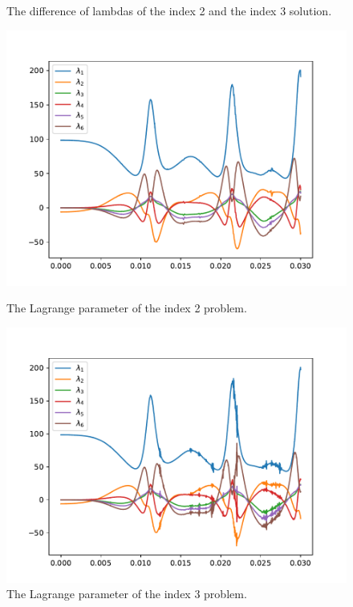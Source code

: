 \documentclass{report}
\begin{document}
\begin{figure}[h]
\begin{minipage}[t]{0.45\textwidth}
\caption{The difference of lambdas of the index 2 and the index 3 solution.}
\label{pl:indx2_solndiff_lambdas}
\end{minipage}
\end{figure}

\begin{figure}[h]
\centering
\begin{minipage}[t]{0.45\textwidth}
\centering
\includegraphics[width=\textwidth]{../Plots/Project2_main/Figure_515}
\caption{The Lagrange parameter of the index 2 problem.}
\label{pl:indx1_soln_lambdas}
\end{minipage}
\hfill
\begin{minipage}[t]{0.45\textwidth}
\centering
\includegraphics[width=\textwidth]{../Plots/Project2_main/Figure_518}
\caption{The Lagrange parameter of the index 3 problem.}
\label{pl:indx2_soln_lambdas}
\end{minipage}
\end{figure}
\end{document}
